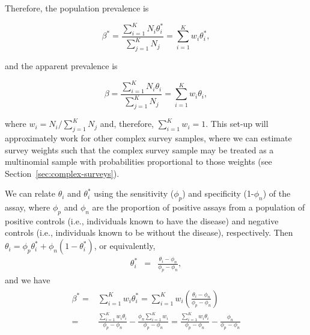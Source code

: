 Therefore, the population prevalence is

\begin{equation}
    \beta^* = \frac{\sum_{i=1}^K N_i \theta_i^*}{\sum_{j=1}^K N_j} = \sum_{i=1}^K w_i \theta_i^*,
    \label{eq:pop-prev}
\end{equation}

and the apparent prevalence is

\begin{equation}
    \beta = \frac{\sum_{i=1}^K N_i \theta_i}{\sum_{j=1}^K N_j} = \sum_{i=1}^K w_i \theta_i,
    \label{eq:app-prev}
\end{equation}

where \( w_i = N_i / \sum_{j=1}^K N_j \) and, therefore, \( \sum_{i=1}^K w_i = 1 \).
This set-up will approximately work for other complex survey samples, where we can estimate survey weights such that the complex survey sample may be treated as a multinomial sample with probabilities proportional to those weights (see Section~\ref{sec:complex-surveys}).

We can relate $\theta_i$ and $\theta_i^*$ using the sensitivity ($\phi_p$) and specificity (1-$\phi_n$) of the assay,
where $\phi_p$ and $\phi_n$ are the proportion of positive assays from a population of positive controls (i.e., individuals known to have the disease) and
negative controls (i.e., individuals known to be without the disease), respectively. Then
$\theta_i = \phi_p \theta_i^* + \phi_n (1-\theta_i^*)$, or equivalently,\cite{Roga:1978}
\begin{eqnarray*}
\theta_i^* & = & \frac{ \theta_i - \phi_n }{\phi_p - \phi_n},
\end{eqnarray*}
and we have
\begin{align}
\begin{split}
  \beta^*   =&   \sum_{i=1}^K w_i \theta_i^*
            =  \sum_{i=1}^K w_i \left( \frac{\theta_i - \phi_n}{\phi_p - \phi_n} \right) \\
            =&   \frac{\sum_{i=1}^K w_i \theta_i}{\phi_p - \phi_n} - \frac{\phi_n \sum_{i=1}^K w_i}{\phi_p - \phi_n}
            =   \frac{\sum_{i=1}^K w_i \theta_i}{\phi_p - \phi_n} - \frac{\phi_n}{\phi_p - \phi_n}
            \label{eq:long-beta}
\end{split}
\end{align}


